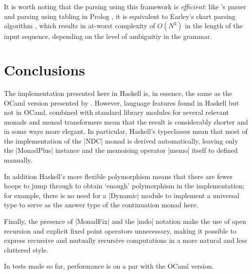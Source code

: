 \documentclass[a4paper,10pt]{article}
\newcommand{\citepos}[1]{\citeauthor{#1}'s \citeyearpar{#1}\xspace}
\begin{document}
It is worth noting that the parsing using this framework is \emph{efficient}: like
\citepos{Johnson1995} parser and parsing using tabling in Prolog \citep{Abdallah2017b},
it is equivalent to Earley's chart parsing algorithm \cite{Earley1970}, which results
in at-worst complexity of $O(N^3)$ in the length of the input sequence, depending on the
level of ambiguitiy in the grammar.

\section{Conclusions}
The implementation presented here in Haskell is, in essence, the same as the OCaml
version presented by \cite{Abdallah2017a}. However, language features found in 
Haskell but not in OCaml, combined with standard library modules for several relevant 
monads and monad transformers mean that the result is considerably shorter and
in some ways more elegant. In particular, Haskell's typeclasses mean that most of
the implementation of the |NDC| monad is derived automatically, leaving only the
|MonadPlus| instance and the memoising operator |memo| itself to defined manually.

In addition Haskell's more flexible polymorphism means that there are fewer hoops
to jump through to obtain `enough' polymorphism in the implementation; for example, 
there is no
need for a |Dynamic| module to implement a universal type to serve as the answer type 
of the continuation monad here.

Finally, the presence of |MonadFix| and the |mdo| notation make the use of open
recursion and explicit fixed point operators unnecessary, making it possible to
express recursive and mutually recursive computations in a more natural and
less cluttered style.

In tests made so far, performance is on a par with the OCaml version.


\end{document}
